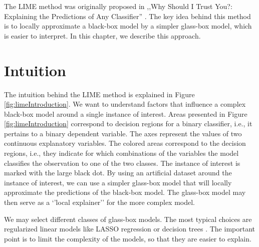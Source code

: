 \documentclass[]{krantz}
\begin{document}
The LIME method was originally proposed in ,,Why Should I Trust You?: Explaining the Predictions of Any Classifier'' \citep{lime}. The key idea behind this method is to locally approximate a black-box model by a simpler glass-box model, which is easier to interpret. In this chapter, we describe this approach.

\hypertarget{LIMEIntuition}{%
\section{Intuition}\label{LIMEIntuition}}

The intuition behind the LIME method is explained in Figure \ref{fig:limeIntroduction}. We want to understand factors that influence a complex black-box model around a single instance of interest. Areas presented in Figure \ref{fig:limeIntroduction} correspond to decision regions for a binary classifier, i.e., it pertains to a binary dependent variable. The axes represent the values of two continuous explanatory variables. The colored areas correspond to the decision regions, i.e., they indicate for which combinations of the variables the model classifies the observation to one of the two classes. The instance of interest is marked with the large black dot. By using an artificial dataset around the instance of interest, we can use a simpler glass-box model that will locally approximate the predictions of the black-box model. The glass-box model may then serve as a `'local explainer'' for the more complex model.

We may select different classes of glass-box models. The most typical choices are regularized linear models like LASSO regression \citep{Tibshirani94regressionshrinkage} or decision trees \citep{party2006}. The important point is to limit the complexity of the models, so that they are easier to explain.
\end{document}
